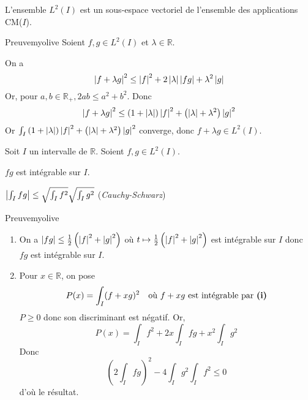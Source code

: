     \begin{prop}{}{}
        L’ensemble $L^2(I)$ est un sous-espace vectoriel de l’ensemble des applications CM($I$).
    \end{prop}

    \begin{demo}{Preuve}{myolive}
        Soient $f,g \in L^2(I)$ et $\lambda \in \mathbb{R}$.

        On a \[ \left\lvert f + \lambda g\right\rvert^2 \leq \left\lvert f\right\rvert^2 + 2 \left\lvert \lambda\right\rvert \left\lvert fg\right\rvert + \lambda^2 \left\lvert g\right\rvert \]    
        Or, pour $a,b \in \mathbb{R}_+, 2ab \leq a^2 + b^2$. Donc 
        \[ \left\lvert f+\lambda g\right\rvert^2 \leq \left( 1 + \left\lvert \lambda\right\rvert \right) \left\lvert f\right\rvert^2 + \left( \left\lvert \lambda\right\rvert + \lambda^2 \right) \left\lvert g\right\rvert^2 \]   
        Or $\int_I \left( 1 + \left\lvert \lambda\right\rvert \right) \left\lvert f\right\rvert^2 + \left( \left\lvert \lambda\right\rvert + \lambda^2 \right) \left\lvert g\right\rvert^2$ converge, donc $ f + \lambda g \in L^2(I)$.
    \end{demo}

    \begin{prop}{}{}
        Soit $I$ un intervalle de $\mathbb{R}$. Soient $f,g \in L^2(I)$. 

        \begin{alors}
            \item $fg$ est intégrable sur $I$.
            \item $\left\lvert \int_I fg\right\rvert \leq \sqrt{\int_I f^2} \sqrt{\int_I g^2}$ (\textit{Cauchy-Schwarz})
        \end{alors}
    \end{prop}

    \begin{demo}{Preuve}{myolive}
        \begin{enumerate}
            \item On a $\left\lvert fg\right\rvert \leq \frac{1}{2} \left(\left\lvert f\right\rvert^2 + \left\lvert g\right\rvert^2\right)$ où $t \mapsto \frac{1}{2} \left(\left\lvert f\right\rvert^2 + \left\lvert g\right\rvert^2\right)$ est intégrable sur $I$ donc $fg$ est intégrable sur $I$.
            \item Pour $x \in \mathbb{R}$, on pose 
            \[ P(x) = \int_I (f + xg)^2 \quad \text{où } f + xg \text{ est intégrable par \textbf{(i)}} \]    
            $P \geq 0$ donc son discriminant est négatif. Or, 
            \[ P(x) = \int_I f^2 + 2x \int_I fg + x^2 \int_I g^2 \]   
            Donc 
            \[ \left( 2 \int_I  fg \right)^2 - 4 \int_I g^2 \int_I f^2 \leq 0 \]
            d’où le résultat.
        \end{enumerate}
    \end{demo}

